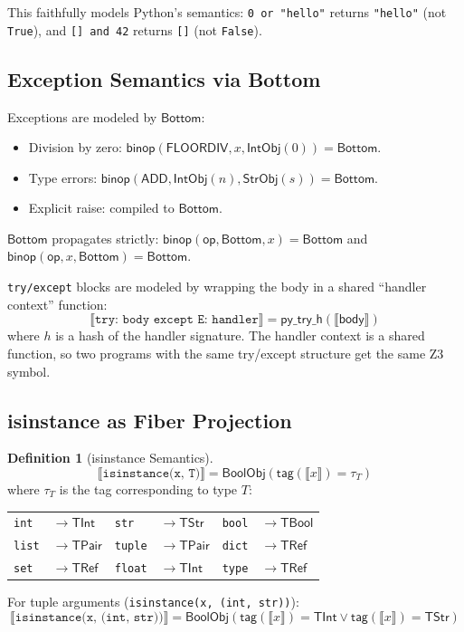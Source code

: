 \documentclass[11pt,a4paper]{report}
\theoremstyle{definition}
\newtheorem{definition}{Definition}[chapter]
\theoremstyle{plain}
\newcommand{\den}[1]{\llbracket #1 \rrbracket}
\newcommand{\op}{\mathsf{op}}
\begin{document}
This faithfully models Python's semantics: \texttt{0 or "hello"}
returns \texttt{"hello"} (not \texttt{True}), and
\texttt{[] and 42} returns \texttt{[]} (not \texttt{False}).

\subsection{Exception Semantics via Bottom}

Exceptions are modeled by $\mathsf{Bottom}$:
\begin{itemize}
  \item Division by zero: $\mathsf{binop}(\mathsf{FLOORDIV}, x,
    \mathsf{IntObj}(0)) = \mathsf{Bottom}$.
  \item Type errors: $\mathsf{binop}(\mathsf{ADD},
    \mathsf{IntObj}(n), \mathsf{StrObj}(s)) = \mathsf{Bottom}$.
  \item Explicit raise: compiled to $\mathsf{Bottom}$.
\end{itemize}

$\mathsf{Bottom}$ propagates strictly:
$\mathsf{binop}(\op, \mathsf{Bottom}, x) = \mathsf{Bottom}$ and
$\mathsf{binop}(\op, x, \mathsf{Bottom}) = \mathsf{Bottom}$.

\texttt{try/except} blocks are modeled by wrapping the body in a
shared ``handler context'' function:
\[
  \den{\texttt{try: body except E: handler}} =
  \mathsf{py\_try\_h}(\den{\mathsf{body}})
\]
where $h$ is a hash of the handler signature.  The handler context
is a shared function, so two programs with the same try/except
structure get the same Z3 symbol.

\subsection{isinstance as Fiber Projection}

\begin{definition}[isinstance Semantics]
\[
  \den{\texttt{isinstance(x, T)}} = \mathsf{BoolObj}(\mathsf{tag}(\den{x}) = \tau_T)
\]
where $\tau_T$ is the tag corresponding to type $T$:

\begin{center}
\begin{tabular}{l l l l l l}
  \texttt{int} & $\to \mathsf{TInt}$ &
  \texttt{str} & $\to \mathsf{TStr}$ &
  \texttt{bool} & $\to \mathsf{TBool}$ \\
  \texttt{list} & $\to \mathsf{TPair}$ &
  \texttt{tuple} & $\to \mathsf{TPair}$ &
  \texttt{dict} & $\to \mathsf{TRef}$ \\
  \texttt{set} & $\to \mathsf{TRef}$ &
  \texttt{float} & $\to \mathsf{TInt}$ &
  \texttt{type} & $\to \mathsf{TRef}$
\end{tabular}
\end{center}

For tuple arguments (\texttt{isinstance(x, (int, str))}):
\[
  \den{\texttt{isinstance(x, (int, str))}} =
    \mathsf{BoolObj}(\mathsf{tag}(\den{x}) = \mathsf{TInt} \lor
    \mathsf{tag}(\den{x}) = \mathsf{TStr})
\]
\end{definition}
\end{document}
